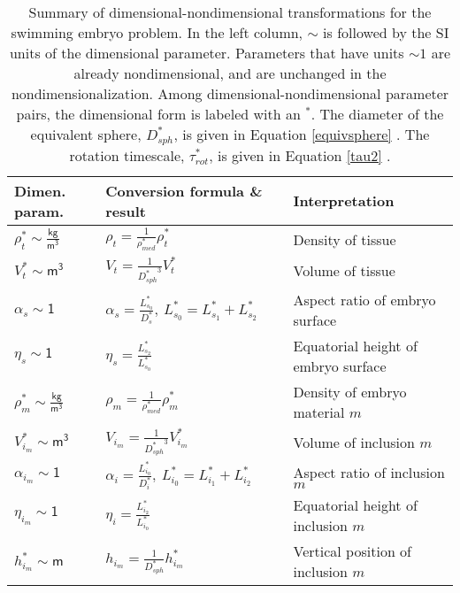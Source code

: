 \documentclass[10pt,a4paper]{article}
\begin{document}
\begin{enumerate}
\end{enumerate}









\begin{table}[h]
	\centering
	\caption{Summary of dimensional-nondimensional transformations for the swimming embryo problem. In the left column, $\sim$ is followed by the SI units of the dimensional parameter. Parameters that have units $\sim 1$ are already nondimensional, and are unchanged in the nondimensionalization. Among dimensional-nondimensional parameter pairs, the dimensional form is labeled with an $^*$. The diameter of the equivalent sphere, $D_{sph}^*$, is given in Equation \ref{equivsphere} . The rotation timescale, $\tau^*_{rot}$, is given in Equation \ref{tau2} .} \label{tab:d2nd}
	\vspace{.25cm}
	\small
	\begin{tabular}{|I|L|l|}
		\hline
		Dimen. param. & Conversion formula \& result & \hspace{1cm} Interpretation \\
		\hline
		$\rho_t^* \sim \mathsf{\frac{kg}{m^3}}$ & $\rho_t = \frac{1}{\rho_{med}^*} \rho_t^* $  & Density of tissue \\
		$V^*_t \sim \mathsf{m^3}$ & $V_t = \frac{1}{{D_{sph}^*}^3} V^*_t $  & Volume of tissue \\
		$\alpha_s \sim \mathsf{1}$ & $\alpha_s = \frac{L^*_{s_0}}{D^*_s}, ~ L^*_{s_0} = L^*_{s_1} + L^*_{s_2}$ & Aspect ratio of embryo surface \\
		$\eta_s \sim \mathsf{1}$ & $\eta_s = \frac{L^*_{s_2}}{L^*_{s_0}}$ & Equatorial height of embryo surface \\
		$\rho_m^* \sim \mathsf{\frac{kg}{m^3}}$ & $\rho_m = \frac{1}{\rho_{med}^*} \rho_m^* $  & Density of embryo material $m$ \\
		$V^*_{i_m} \sim \mathsf{m^3}$ & $V_{i_m} = \frac{1}{{D_{sph}^*}^3} V^*_{i_m} $  & Volume of inclusion $m$ \\
		$\alpha_{i_m} \sim \mathsf{1}$ & $\alpha_i = \frac{L^*_{i_0}}{D^*_i}, ~ L^*_{i_0} = L^*_{i_1} + L^*_{i_2}$ & Aspect ratio of inclusion $m$ \\
		$\eta_{i_m} \sim \mathsf{1}$ & $\eta_i = \frac{L^*_{i_2}}{L^*_{i_0}}$ & Equatorial height of inclusion $m$ \\
		$h^*_{i_m} \sim \mathsf{m}$ & $h_{i_m} = \frac{1}{{D_{sph}^*}} h^*_{i_m} $  & Vertical position of inclusion $m$ \\

\end{tabular}
\end{table}
\end{document}
